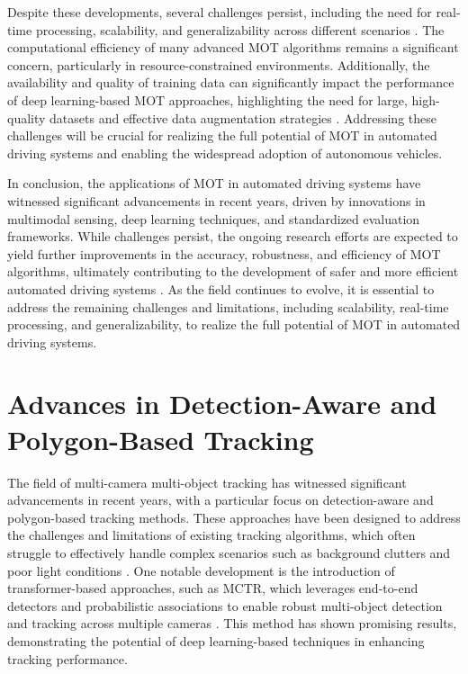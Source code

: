 \documentclass[conference]{IEEEtran}
\begin{document}
Despite these developments, several challenges persist, including the need for real-time processing, scalability, and generalizability across different scenarios \cite{Multiple Object Tracking in Recent Times: A Literature Review}. The computational efficiency of many advanced MOT algorithms remains a significant concern, particularly in resource-constrained environments. Additionally, the availability and quality of training data can significantly impact the performance of deep learning-based MOT approaches, highlighting the need for large, high-quality datasets and effective data augmentation strategies \cite{MOTChallenge: A Benchmark for Single-Camera Multiple Target Tracking}. Addressing these challenges will be crucial for realizing the full potential of MOT in automated driving systems and enabling the widespread adoption of autonomous vehicles.

In conclusion, the applications of MOT in automated driving systems have witnessed significant advancements in recent years, driven by innovations in multimodal sensing, deep learning techniques, and standardized evaluation frameworks. While challenges persist, the ongoing research efforts are expected to yield further improvements in the accuracy, robustness, and efficiency of MOT algorithms, ultimately contributing to the development of safer and more efficient automated driving systems \cite{Multiple Object Tracking: A Literature Review}. As the field continues to evolve, it is essential to address the remaining challenges and limitations, including scalability, real-time processing, and generalizability, to realize the full potential of MOT in automated driving systems.

\section{Advances in Detection-Aware and Polygon-Based Tracking}
The field of multi-camera multi-object tracking has witnessed significant advancements in recent years, with a particular focus on detection-aware and polygon-based tracking methods. These approaches have been designed to address the challenges and limitations of existing tracking algorithms, which often struggle to effectively handle complex scenarios such as background clutters and poor light conditions \cite{Challenge of Multi-Camera Tracking}. One notable development is the introduction of transformer-based approaches, such as MCTR, which leverages end-to-end detectors and probabilistic associations to enable robust multi-object detection and tracking across multiple cameras \cite{MCTR: Multi Camera Tracking Transformer}. This method has shown promising results, demonstrating the potential of deep learning-based techniques in enhancing tracking performance.
\end{document}

